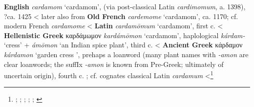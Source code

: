 \begin{etymology}\label{ety:cardamom}
\textbf{English} \textit{cardamom} `cardamom', (via post-classical Latin \textit{cardimomum}, a. 1398), ?ca. 1425
< later also from \textbf{Old French} \textit{cardemome} `cardamom', ca. 1170; cf. modern French \textit{cardamome}
< \textbf{Latin} \textit{cardamōmum} `cardamom', first c. \AD{}
< \textbf{Hellenistic Greek} {καρδάμωμον} \textit{kardámōmon} `cardamom', haplological  \textit{kárdam-} `cress' +  \textit{ámōmon} `an Indian spice plant', third c. \BC{}
< \textbf{Ancient Greek} {κάρδαμον} \textit{kárdamon} `garden cress ', prehaps a loanword (many plant names with \textit{-amon} are clear loanwords; the suffIx \textit{-amon} is known from Pre-Greek; ultimately of uncertain origin), fourth c. \BC{}; cf. cognates classical Latin \textit{cardamum}
<\footnote{\textcite[s.v. cardamom]{oed}; \textcite[s.v. cardamome]{tlfi}; \textcite[s.v. cardamomum]{lewis_latin_1879}; \textcite[s.v. καρδάμωμον]{liddell_greek-english_1940}; \textcite[s.v. κάρδαμον]{liddell_greek-english_1940}; \textcite[644]{beekes_etymological_2010}}
\end{etymology}